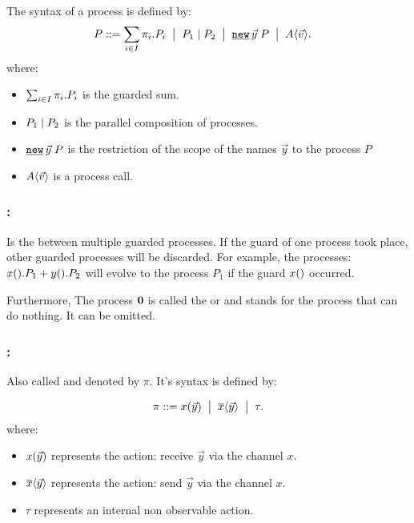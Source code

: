 \begin{definition}
\label{def_process_syntax}
The syntax of a \picalc{} process  is defined by: 
\begin{align*}
 P & \syntdef \procsum \ebnf \procpar{P_1}{P_2} \ebnf \procres{\vec{y}}{P} \ebnf \proccall{A}{\vec{v}}.
\end{align*}
where:
\begin{itemize}
\item $\sum_{i\in I}{\pi_i.P_i}$ is the guarded sum.
\item $P_1 \mid P_2$ is the parallel composition of processes.
\item $\procres{\vec{y}}{P}$ is the restriction of the scope of the names $\vec{y}$ to the process $P$
\item $A\langle\vec{v}\rangle$ is a process call. 
\end{itemize}
\end{definition}

\subsubsection{:} Is the  between multiple guarded processes. If the guard of one process took place, other guarded processes will be discarded. For example, the processes: $x().P_1 + y().P_2$ will evolve to the process $P_1$ if the guard $x()$ occurred.

Furthermore, The process $\mathbf{0}$ is called the  or  and stands for the process that can do nothing. It can be omitted.
\subsubsection{:} Also called  and denoted by $\pi$. It's syntax is defined by:
\begin{definition}
\label{def_prefix_syntax}
\begin{align*}
 \pi ::= x(\vec{y}) \;\bigm|\; \overline{x}\langle\vec{y}\rangle \;\bigm|\; \tau.
\end{align*}
where:
\begin{itemize}
\item $x(\vec{y})$ represents the action: receive $\vec{y}$ via the channel $x$.
\item $\overline{x}\langle\vec{y}\rangle$ represents the action: send $\vec{y}$ via the channel $x$.
\item $\tau$ represents an internal non observable action.
\end{itemize}
\end{definition}
 
